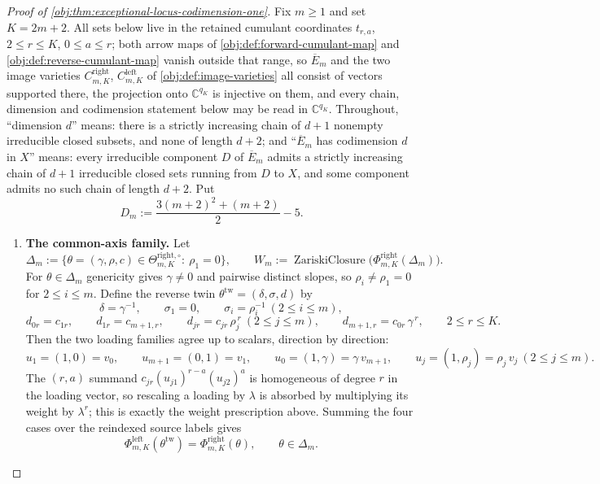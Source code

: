 \begin{proof}[Proof of \cref{obj:thm:exceptional-locus-codimension-one}]
Fix \(m\ge 1\) and set \(K=2m+2\).  All sets below live in the retained cumulant coordinates \(t_{r,a}\), \(2\le r\le K\), \(0\le a\le r\); both arrow maps of \cref{obj:def:forward-cumulant-map} and \cref{obj:def:reverse-cumulant-map} vanish outside that range, so \(\overline E_m\) and the two image varieties \(C^{\mathrm{right}}_{m,K}\), \(C^{\mathrm{left}}_{m,K}\) of \cref{obj:def:image-varieties} all consist of vectors supported there, the projection onto \(\mathbb C^{q_K}\) is injective on them, and every chain, dimension and codimension statement below may be read in \(\mathbb C^{q_K}\).  Throughout, ``dimension \(d\)'' means: there is a strictly increasing chain of \(d+1\) nonempty irreducible closed subsets, and none of length \(d+2\); and ``\(\overline E_m\) has codimension \(d\) in \(X\)'' means: every irreducible component \(D\) of \(\overline E_m\) admits a strictly increasing chain of \(d+1\) irreducible closed sets running from \(D\) to \(X\), and some component admits no such chain of length \(d+2\).  Put
\[
D_m:=\frac{3(m+2)^2+(m+2)}{2}-5 .
\]

\begin{enumerate}
\item \textbf{The common-axis family.}  Let
\[
\Delta_m:=\bigl\{\theta=(\gamma,\rho,c)\in\Theta^{\mathrm{right},\circ}_{m,K}:\ \rho_1=0\bigr\},
\qquad
W_m:=\operatorname{ZariskiClosure}\bigl(\Phi^{\mathrm{right}}_{m,K}(\Delta_m)\bigr).
\]
For \(\theta\in\Delta_m\) genericity gives \(\gamma\ne0\) and pairwise distinct slopes, so \(\rho_i\ne\rho_1=0\) for \(2\le i\le m\).  Define the reverse twin \(\theta^{\mathrm{tw}}=(\delta,\sigma,d)\) by
\[
\delta=\gamma^{-1},\qquad
\sigma_1=0,\qquad
\sigma_i=\rho_i^{-1}\ (2\le i\le m),
\]
\[
d_{0r}=c_{1r},\qquad
d_{1r}=c_{m+1,r},\qquad
d_{jr}=c_{jr}\,\rho_j^{\,r}\ (2\le j\le m),\qquad
d_{m+1,r}=c_{0r}\,\gamma^{\,r},
\qquad 2\le r\le K .
\]
Then the two loading families agree up to scalars, direction by direction:
\[
u_1=(1,0)=v_0,\qquad
u_{m+1}=(0,1)=v_1,\qquad
u_0=(1,\gamma)=\gamma\,v_{m+1},\qquad
u_j=(1,\rho_j)=\rho_j\,v_j\ (2\le j\le m).
\]
The \((r,a)\) summand \(c_{jr}(u_{j1})^{r-a}(u_{j2})^{a}\) is homogeneous of degree \(r\) in the loading vector, so rescaling a loading by \(\lambda\) is absorbed by multiplying its weight by \(\lambda^{r}\); this is exactly the weight prescription above.  Summing the four cases over the reindexed source labels gives
\[
\Phi^{\mathrm{left}}_{m,K}(\theta^{\mathrm{tw}})=\Phi^{\mathrm{right}}_{m,K}(\theta),
\qquad \theta\in\Delta_m .
\]


\end{enumerate}
\end{proof}
